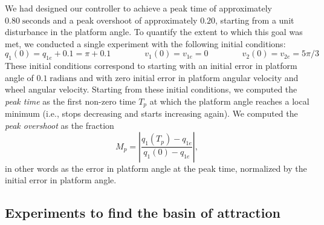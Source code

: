 \documentclass[conf]{new-aiaa}
\begin{document}
We had designed our controller to achieve a peak time of approximately $0.80\;\text{seconds}$ and a peak overshoot of approximately $0.20$, starting from a unit disturbance in the platform angle. To quantify the extent to which this goal was met, we conducted a single experiment with the following initial conditions:
\begin{equation}
q_{1}(0) = q_{1e} + 0.1 = \pi + 0.1
\qquad\qquad
v_{1}(0) = v_{1e} = 0
\qquad\qquad
v_{2}(0) = v_{2e} = 5\pi/3
\label{eq-peak-ics}
\end{equation}
These initial conditions correspond to starting with an initial error in platform angle of $0.1\;\text{radians}$ and with zero initial error in platform angular velocity and wheel angular velocity.
Starting from these initial conditions, we computed the {\em peak time} as the first non-zero time $T_{p}$ at which the platform angle reaches a local minimum (i.e., stops decreasing and starts increasing again).
We computed the {\em peak overshoot} as the fraction
\begin{equation}
M_{p} = \left\lvert\frac{q_{1}(T_{p}) - q_{1e}}{q_{1}(0) - q_{1e}}\right\rvert,
\end{equation}
in other words as the error in platform angle at the peak time, normalized by the initial error in platform angle.

\subsection{Experiments to find the basin of attraction}
\label{sec-basin}
\end{document}
